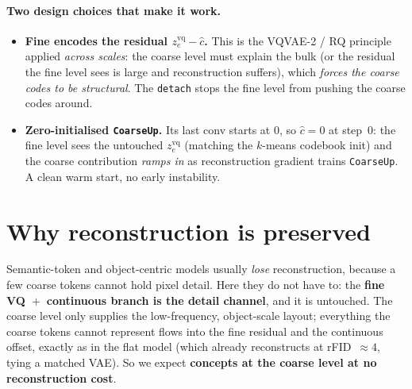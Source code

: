 \documentclass[11pt]{article}
\newcommand{\code}[1]{\texttt{#1}}
\begin{document}
\paragraph{Two design choices that make it work.}
\begin{itemize}
  \item \textbf{Fine encodes the residual $z_e^{\text{vq}}-\hat{c}$.} This is the VQVAE-2 / RQ principle
  applied \emph{across scales}: the coarse level must explain the bulk (or the residual the fine level
  sees is large and reconstruction suffers), which \emph{forces the coarse codes to be structural}.
  The \code{detach} stops the fine level from pushing the coarse codes around.
  \item \textbf{Zero-initialised \code{CoarseUp}.} Its last conv starts at $0$, so $\hat{c}=0$ at step~0:
  the fine level sees the untouched $z_e^{\text{vq}}$ (matching the $k$-means codebook init) and the
  coarse contribution \emph{ramps in} as reconstruction gradient trains \code{CoarseUp}. A clean warm
  start, no early instability.
\end{itemize}

\section{Why reconstruction is preserved}
Semantic-token and object-centric models usually \emph{lose} reconstruction, because a few coarse
tokens cannot hold pixel detail. Here they do not have to: the \textbf{fine VQ~$+$~continuous branch is
the detail channel}, and it is untouched. The coarse level only supplies the low-frequency,
object-scale layout; everything the coarse tokens cannot represent flows into the fine residual and the
continuous offset, exactly as in the flat model (which already reconstructs at rFID~$\approx4$, tying a
matched VAE). So we expect \textbf{concepts at the coarse level at no reconstruction cost}.
\end{document}
